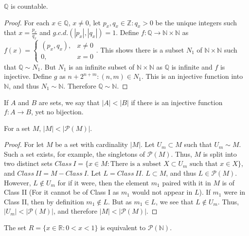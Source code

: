 \documentclass[crop=false,class=book,oneside]{standalone}
\begin{document}
            \begin{theorem}
            $\mathbb{Q}$ is countable.
            \end{theorem}
            \begin{proof}
            For each $x\in \mathbb{Q}$, $x\ne 0$, let $p_x,q_x\in\mathbb{Z}:q_x>0$ be the unique integers such that $x = \frac{p_x}{q_x}$ and $g.c.d.(|p_x|,|q_x|)=1$. Define $f:\mathbb{Q}\rightarrow \mathbb{N}\times \mathbb{N}$ as $f(x) = \begin{cases}(p_x,q_x), & x\ne 0 \\ 0, & x=0\end{cases}$. This shows there is a subset $N_1$ of $\mathbb{N}\times \mathbb{N}$ such that $\mathbb{Q}\sim N_1$. But $N_1$ is an infinite subset of $\mathbb{N}\times\mathbb{N}$ as $\mathbb{Q}$ is infinite and $f$ is injective. Define $g$ as $n+2^{n+m}:(n,m)\in N_1$. This is an injective function into $\mathbb{N}$, and thus $N_1 \sim \mathbb{N}$. Therefore $\mathbb{Q}\sim \mathbb{N}$.
            \end{proof}
            \begin{definition}
            If $A$ and $B$ are sets, we say that $|A|<|B|$ if there is an injective function $f:A\rightarrow B$, yet no bijection.
            \end{definition}
            \begin{theorem}
            For a set $M$, $|M|<|\mathcal{P}(M)|$.
            \end{theorem}
            \begin{proof}
            For let $M$ be a set with cardinality $|M|$. Let $U_m \subset M$ such that $U_m \sim M$. Such a set exists, for example, the singletons of $\mathcal{P}(M)$. Thus, $M$ is split into two distinct sets $Class\ I=\{x\in M: \textrm{There is a subset } X\subset U_m\textrm{ such that }x\in X\}$, and $Class\ II=M-Class\ I$. Let $L = Class\ II$. $L\subset M$, and thus $L\in \mathcal{P}(M)$. However, $L \notin U_m$ for if it were, then the element $m_1$ paired with it in $M$ is of Class II (For it cannot be of Class I as $m_1$ would not appear in $L$). If $m_1$ were in Class II, then by definition $m_1 \notin L$. But as $m_1 \in L$, we see that $L\notin U_m$. Thus, $|U_m| <|\mathcal{P}(M)|$, and therefore $|M|<|\mathcal{P}(M)|$.
            \end{proof}
            \begin{theorem}
            The set $R=\{x\in \mathbb{R}:0<x<1\}$ is equivalent to $\mathcal{P}(\mathbb{N})$.
            \end{theorem}
\end{document}
